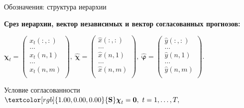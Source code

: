 \documentclass{beamer}
\newcommand{\hchi}{\hat{\boldsymbol{\chi}}}
\newcommand{\hphi}{\hat{\boldsymbol{\varphi}}}
\newcommand{\SM}{\mathbf{S}}
\begin{document}
\begin{frame}{Обозначения: структура иерархии}

    \textbf{Срез иерархии, вектор независимых и вектор согласованных
    прогнозов:} \vspace{0.1cm}

    {\small
    $\boldsymbol{\chi}_t = \left(%
                        \begin{array}{c}
                        x_t(:, :) \\
                        \ldots \\
                        x_t(n, 1) \\
                        \ldots \\
                        x_t(n, m) \\
                        \end{array}%
                      \right),~
            \hchi = \left(%
                    \begin{array}{c}
                        \hat{x}(:, :) \\
                        \ldots \\
                        \hat{x}(n, 1) \\
                        \ldots \\
                        \hat{x}(n, m) \\
                    \end{array}%
                    \right),~
            \hphi = \left(%
                    \begin{array}{c}
                        \hat{y}(:, :) \\
                        \ldots \\
                        \hat{y}(n, 1) \\
                        \ldots \\
                        \hat{y}(n, m) \\
                    \end{array}%
                    \right).$}

    \vspace{0.3cm}
    Условие согласованности~~~~~~$\textcolor[rgb]{1.00,0.00,0.00}{\SM} \boldsymbol{\chi}_t =
        \boldsymbol{0}, ~ t = 1, \ldots, T,$


\end{frame}
\end{document}
